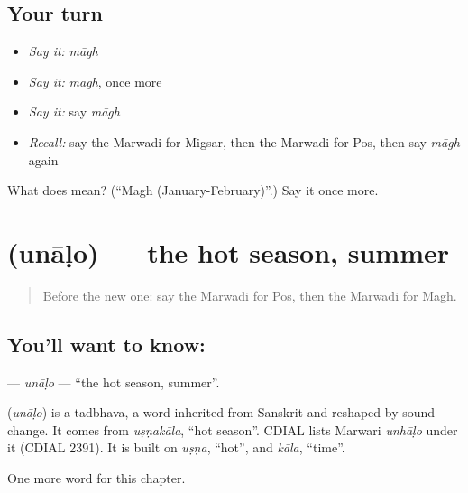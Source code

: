 \subsection*{Your turn}
\begin{itemize}
\raggedright
  \item \emph{Say it:} \emph{māgh}
  \item \emph{Say it:} \emph{māgh}, once more
  \item \emph{Say it:} say \emph{māgh}
  \item \emph{Recall:} say the Marwadi for Migsar, then the Marwadi for Pos, then say \emph{māgh} again
\end{itemize}

\begin{tcolorbox}[breakable,colback=teal!4,colframe=teal!35!black,title={Before you move on}]
What does  mean? (\textquotedblleft{}Magh (January-February)\textquotedblright{}.) Say it once more.
\end{tcolorbox}
\section[\texorpdfstring{\mw{उनाळो} (unāḷo)}{उनाळो (unāḷo)}]{ (unāḷo) — the hot season, summer}

\label{lesson:MW-C94-unalo}



\begin{quote}
Before the new one: say the Marwadi for Pos, then the Marwadi for Magh.
\end{quote}

\subsection*{You'll want to know: }
\textbf{} — \emph{unāḷo} — \textquotedblleft{}the hot season, summer\textquotedblright{}.

\begin{cousinweb}
\textbf{} (\emph{unāḷo}) is a tadbhava, a word inherited from Sanskrit and reshaped by sound change. It comes from \emph{uṣṇakāla}, \textquotedblleft{}hot season\textquotedblright{}. CDIAL lists Marwari \emph{unhāḷo} under it (CDIAL 2391). It is built on \emph{uṣṇa}, \textquotedblleft{}hot\textquotedblright{}, and \emph{kāla}, \textquotedblleft{}time\textquotedblright{}.
\end{cousinweb}

\begin{grammarlens}[title={What you've built}]
One more word for this chapter.
\end{grammarlens}

